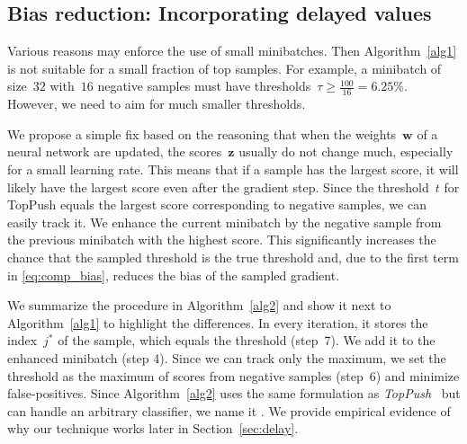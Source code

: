 \subsection{Bias reduction: Incorporating delayed values}\label{sec:bias2}

Various reasons may enforce the use of small minibatches. Then Algorithm~\ref{alg1} is not suitable for a small fraction of top samples. For example, a minibatch of size~$32$ with~$16$ negative samples must have thresholds~$\tau\geq \frac{100}{16}=6.25\%$. However, we need to aim for much smaller thresholds.

We propose a simple fix based on the reasoning that when the weights~$\bm{w}$ of a neural network are updated, the scores~$\bm{z}$ usually do not change much, especially for a small learning rate. This means that if a sample has the largest score, it will likely have the largest score even after the gradient step. Since the threshold~$t$ for TopPush equals the largest score corresponding to negative samples, we can easily track it. We enhance the current minibatch by the negative sample from the previous minibatch with the highest score. This significantly increases the chance that the sampled threshold is the true threshold and, due to the first term in \eqref{eq:comp_bias}, reduces the bias of the sampled gradient.

We summarize the procedure in Algorithm~\ref{alg2} and show it next to Algorithm~\ref{alg1} to highlight the differences. In every iteration, it stores the index~$j^*$ of the sample, which equals the threshold (step~7). We add it to the enhanced minibatch (step 4). Since we can track only the maximum, we set the threshold as the maximum of scores from negative samples (step~6) and minimize false-positives. Since Algorithm~\ref{alg2} uses the same formulation as \textit{TopPush}~\cite{li2014top} but can handle an arbitrary classifier, we name it \DeepTopPush. We provide empirical evidence of why our technique works later in Section~\ref{sec:delay}.
